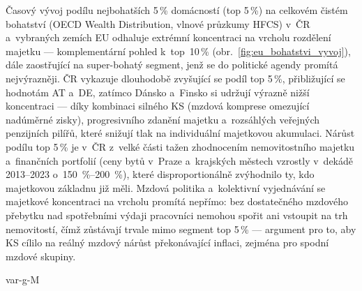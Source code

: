 Časový vývoj podílu nejbohatších 5\,\% domácností (top 5\,\%) na celkovém čistém bohatství (OECD Wealth Distribution, vlnové průzkumy HFCS) v~ČR a~vybraných zemích \ac{EU} odhaluje extrémní koncentraci na vrcholu rozdělení majetku --- komplementární pohled k~top~10\,\% (obr.~\ref{fig:eu_bohatstvi_vyvoj}), dále zaostřující na super-bohatý segment, jenž se do politické agendy promítá nejvýrazněji.
ČR vykazuje dlouhodobě zvyšující se podíl top 5\,\%, přibližující se hodnotám AT a~DE, zatímco Dánsko a~Finsko si udržují výrazně nižší koncentraci --- díky kombinaci silného \ac{KS} (mzdová komprese omezující nadúměrné zisky), progresivního zdanění majetku a~rozsáhlých veřejných penzijních pilířů, které snižují tlak na individuální majetkovou akumulaci.
Nárůst podílu top 5\,\% je v~ČR z~velké části tažen zhodnocením nemovitostního majetku a~finančních portfolií (ceny bytů v~Praze a~krajských městech vzrostly v~dekádě 2013--2023 o~\SIrange{150}{200}{\percent}), které disproportionálně zvýhodnilo ty, kdo majetkovou základnu již měli.
Mzdová politika a~kolektivní vyjednávání se majetkové koncentraci na vrcholu promítá nepřímo: bez dostatečného mzdového přebytku nad spotřebními výdaji pracovníci nemohou spořit ani vstoupit na trh nemovitostí, čímž zůstávají trvale mimo segment top 5\,\% --- argument pro to, aby \ac{KS} cílilo na reálný mzdový nárůst překonávající inflaci, zejména pro spodní mzdové skupiny.

\acs{var-g-M}
%
